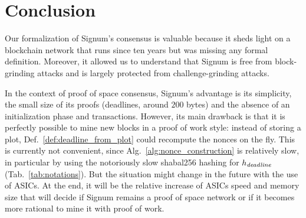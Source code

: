 \section{Conclusion}\label{sec:conclusion}
%
Our formalization of Signum's consensus is valuable because it sheds light
on a blockchain network that runs since ten years but was missing any formal definition.
Moreover, it allowed us to understand that Signum is free from block-grinding attacks
and is largely protected from challenge-grinding attacks.

In the context of proof of space consensus, Signum's advantage is its simplicity,
the small size of its proofs (deadlines, around $200$ bytes)
and the absence of an initialization phase and transactions.
However, its main drawback is that it is
perfectly possible to mine new blocks in a proof of work style: instead of storing a plot,
Def.~\ref{def:deadline_from_plot} could recompute the nonces on the fly. This is currently
not convenient, since Alg.~\ref{alg:nonce_construction} is relatively slow, in particular
by using the notoriously slow shabal256 hashing for $h_{\mathit{deadline}}$ (Tab.~\ref{tab:notations}).
But the situation might change in the future
with the use of ASICs. At the end, it will be the relative
increase of ASICs speed and memory size that will decide if Signum remains a
proof of space network or if it becomes more rational to mine it with proof of work.
